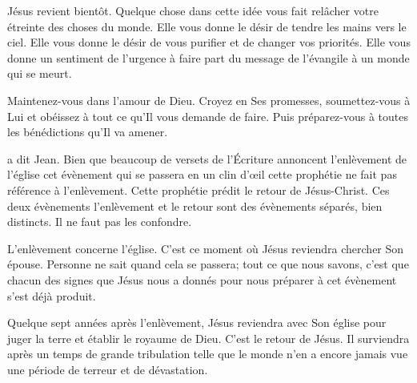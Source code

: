 Jésus revient bientôt. Quelque chose dans cette idée vous fait
 relâcher votre étreinte des choses du monde.
 Elle vous donne le désir de tendre les mains vers le ciel.
 Elle vous donne le désir de vous purifier et de changer vos priorités.
 Elle vous donne un sentiment de l'urgence à faire part du message
 de l'évangile à un monde qui se meurt. 

Maintenez-vous dans l'amour de Dieu. Croyez en Ses promesses,
 soumettez-vous à Lui et obéissez à tout ce qu'Il vous demande de faire.
 Puis préparez-vous à toutes les bénédictions qu'Il va amener. 

\dvrule







 
 a dit Jean.
 Bien que beaucoup de versets de l'Écriture annoncent
 l'enlèvement de l'église 
 \ocadr cet évènement qui se passera en un clin d'œil \fcadr{} 
 cette prophétie ne fait pas référence à l'enlèvement.
 Cette prophétie prédit le retour de Jésus-Christ.
 Ces deux évènements \ocadr l'enlèvement et le retour \fcadr{}
 sont des évènements séparés, bien distincts.
 Il ne faut pas les confondre. 

L'enlèvement concerne l'église. 
 C'est ce moment où Jésus reviendra chercher Son épouse.
 Personne ne sait quand cela se passera; tout ce que nous savons,
 c'est que chacun des signes que Jésus nous a donnés pour nous préparer
 à cet évènement s'est déjà produit. 


Quelque  sept années après l'enlèvement,
 Jésus reviendra avec Son église pour juger la terre
 et établir le royaume de Dieu. C'est le retour de Jésus.
 Il surviendra après un temps de grande tribulation
 telle que le monde n'en a encore jamais vue
 \ocadr une période de terreur et de dévastation. 

